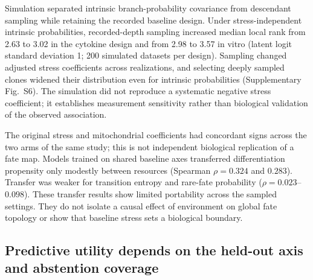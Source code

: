 \documentclass[a4paper,fleqn]{cas-sc}
\makeatletter
\DeclareRobustCommand{\rev}[1]{{\color{red}\def\@citecolor{black}\def\@linkcolor{red}\def\@urlcolor{red}#1}}
\makeatother
\begin{document}
\rev{Simulation separated intrinsic branch-probability covariance from descendant sampling while retaining the recorded baseline design.} \rev{Under stress-independent intrinsic probabilities, recorded-depth sampling increased median local rank from 2.63 to 3.02 in the cytokine design and from 2.98 to 3.57 in vitro (latent logit standard deviation 1; 200 simulated datasets per design).} \rev{Sampling changed adjusted stress coefficients across realizations, and selecting deeply sampled clones widened their distribution even for intrinsic probabilities (Supplementary Fig.~S6).} \rev{The simulation did not reproduce a systematic negative stress coefficient; it establishes measurement sensitivity rather than biological validation of the observed association.}

The original stress and mitochondrial coefficients had concordant signs across the two arms of the same study; this is not independent biological replication of a fate map. Models trained on shared baseline axes transferred differentiation propensity only modestly between resources (Spearman $\rho=0.324$ and $0.283$). Transfer was weaker for transition entropy and rare-fate probability ($\rho=0.023$--$0.098$). These transfer results show limited portability across the sampled settings. They do not isolate a causal effect of environment on global fate topology or show that baseline stress sets a biological boundary.



\subsection*{Predictive utility depends on the held-out axis and abstention coverage}
\end{document}
